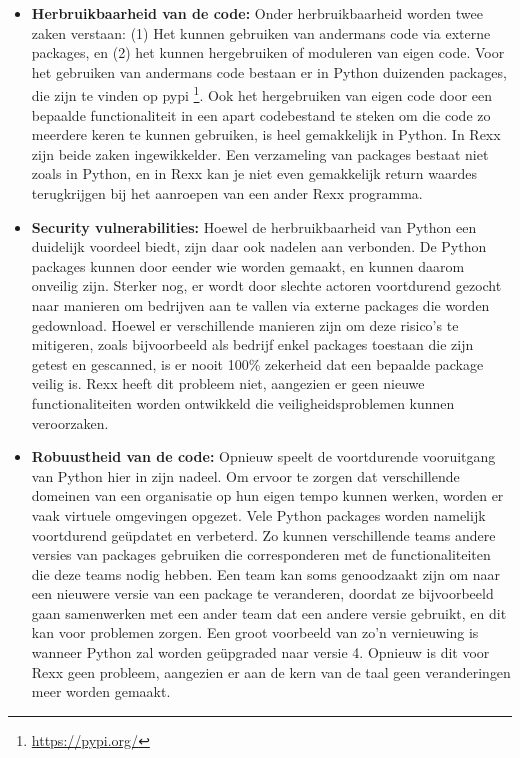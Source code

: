 \begin{itemize}
    Pakketoplossingen kunnen gaan over het beheren van incidenten, wachtwoordkluizen zoals CyberArk of inventarislijsten zoals CMDB (Configuration Management Database). Al deze zaken worden bijgehouden buiten het mainframe, dus het mainframe moet kunnen communiceren met deze tools. De communicatie naar die tools gebeurt voornamelijk met behulp van het HTTP protocol. Dat is wederom gemakkelijk te doen in Python, maar veel ingewikkelder in Rexx.
    \item \textbf{Herbruikbaarheid van de code:} Onder herbruikbaarheid worden twee zaken verstaan: (1) Het kunnen gebruiken van andermans code via externe packages, en (2) het kunnen hergebruiken of moduleren van eigen code. Voor het gebruiken van andermans code bestaan er in Python duizenden packages, die zijn te vinden op pypi \footnote{\url{https://pypi.org/}\label{fn:pypipage}}. Ook het hergebruiken van eigen code door een bepaalde functionaliteit in een apart codebestand te steken om die code zo meerdere keren te kunnen gebruiken, is heel gemakkelijk in Python. In Rexx zijn beide zaken ingewikkelder. Een verzameling van packages bestaat niet zoals in Python, en in Rexx kan je niet even gemakkelijk return waardes terugkrijgen bij het aanroepen van een ander Rexx programma.
    \item \textbf{Security vulnerabilities:} Hoewel de herbruikbaarheid van Python een duidelijk voordeel biedt, zijn daar ook nadelen aan verbonden. De Python packages kunnen door eender wie worden gemaakt, en kunnen daarom onveilig zijn. Sterker nog, er wordt door slechte actoren voortdurend gezocht naar manieren om bedrijven aan te vallen via externe packages die worden gedownload. Hoewel er verschillende manieren zijn om deze risico's te mitigeren, zoals bijvoorbeeld als bedrijf enkel packages toestaan die zijn getest en gescanned, is er nooit 100\% zekerheid dat een bepaalde package veilig is. Rexx heeft dit probleem niet, aangezien er geen nieuwe functionaliteiten worden ontwikkeld die veiligheidsproblemen kunnen veroorzaken.
    \item \textbf{Robuustheid van de code:} Opnieuw speelt de voortdurende vooruitgang van Python hier in zijn nadeel. Om ervoor te zorgen dat verschillende domeinen van een organisatie op hun eigen tempo kunnen werken, worden er vaak virtuele omgevingen opgezet. Vele Python packages worden namelijk voortdurend geüpdatet en verbeterd. Zo kunnen verschillende teams andere versies van packages gebruiken die corresponderen met de functionaliteiten die deze teams nodig hebben. Een team kan soms genoodzaakt zijn om naar een nieuwere versie van een package te veranderen, doordat ze bijvoorbeeld gaan samenwerken met een ander team dat een andere versie gebruikt, en dit kan voor problemen zorgen. Een groot voorbeeld van zo'n vernieuwing is wanneer Python zal worden geüpgraded naar versie 4. Opnieuw is dit voor Rexx geen probleem, aangezien er aan de kern van de taal geen veranderingen meer worden gemaakt. 

\end{itemize}
